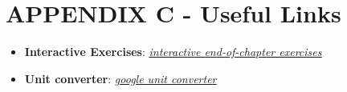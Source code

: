 \documentclass{article}
\begin{document}
%
%


\section{APPENDIX C - Useful Links}
\begin{itemize}
	\item \textbf{Interactive Exercises}: \underline{\textit{\hyperlink{https://gaia.cs.umass.edu/kurose_ross/interactive/}{interactive end-of-chapter exercises}}}
	\item \textbf{Unit converter}: \underline{\textit{\hyperlink{https://www.google.com/search?q=unit+converter}{google unit converter}}}
\end{itemize}
\end{document}
